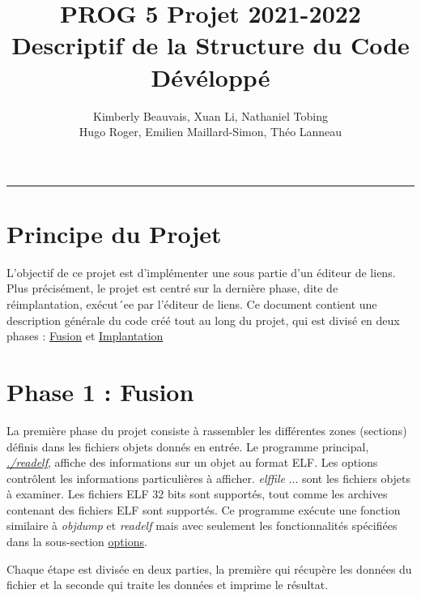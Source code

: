 \documentclass[a4paper]{article} %
\title{PROG 5 Projet 2021-2022 \\
\large Descriptif de la Structure du Code Dévéloppé}
\author{Kimberly Beauvais, Xuan Li, Nathaniel Tobing \\
Hugo Roger, Emilien Maillard-Simon, Théo Lanneau}
\begin{document}
\maketitle
\begin{center}
\rule{\textwidth}{1pt}
\end{center}

\renewcommand{\contentsname}{Table des Matières}
\tableofcontents

\newpage


\section*{Principe du Projet}
L'objectif de ce projet est d’implémenter une sous partie d’un éditeur de liens. 
Plus précisément, le projet est centré sur la dernière phase, dite de réimplantation, 
exécut´ee par l’éditeur de liens. Ce document contient une description générale du 
code créé tout au long du projet, qui est divisé en deux phases : 
\hyperref[sec:phase1]{Fusion} et \hyperref[sec:phase2]{Implantation}


\section{Phase 1 : Fusion }
\label{sec:phase1}
La première phase du projet consiste à rassembler les différentes zones (sections)
définis dans les fichiers objets donnés en entrée. Le programme principal, \hyperref[sec:readelf]{\textit{./readelf}}, 
affiche des informations sur un objet au format ELF.  Les options contrôlent les 
informations particulières à afficher. \textit{elffile} \label{sec:elffile}... sont les fichiers 
objets à examiner.  Les fichiers ELF 32 bits sont supportés, tout comme les 
archives contenant des fichiers ELF sont supportés. Ce programme exécute une 
fonction similaire à \textit{objdump} et \textit{readelf} mais avec seulement 
les fonctionnalités spécifiées dans la sous-section \hyperref[sec:options]{options}. 


Chaque étape est divisée en deux parties, la première qui récupère les données 
du fichier et la seconde qui traite les données et imprime le résultat.
\end{document}
